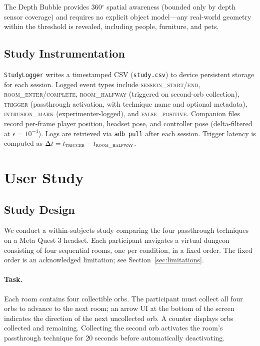 \documentclass{styling/vgtc} %
\begin{document}
The Depth Bubble provides 360$^\circ$ spatial awareness (bounded only by
depth sensor coverage) and requires no explicit object model---any
real-world geometry within the threshold is revealed, including people,
furniture, and pets.

\subsection{Study Instrumentation}

\texttt{StudyLogger} writes a timestamped CSV (\texttt{study.csv}) to
device persistent storage for each session. Logged event types include
\textsc{session\_start/end}, \textsc{room\_enter/complete},
\textsc{room\_halfway} (triggered on second-orb collection),
\textsc{trigger} (passthrough activation, with technique name and
optional metadata), \textsc{intrusion\_mark} (experimenter-logged),
and \textsc{false\_positive}. Companion files record per-frame player
position, headset pose, and controller pose (delta-filtered at
$\epsilon = 10^{-4}$). Logs are retrieved via \texttt{adb pull} after
each session. Trigger latency is computed as
$\Delta t = t_{\textsc{trigger}} - t_{\textsc{room\_halfway}}$.


\section{User Study}
\label{sec:study}

\subsection{Study Design}

We conduct a within-subjects study comparing the four passthrough
techniques on a Meta Quest 3 headset. Each participant navigates a
virtual dungeon consisting of four sequential rooms, one per condition,
in a fixed order. The fixed order is an acknowledged limitation; see
Section~\ref{sec:limitations}.

\paragraph{Task.}
Each room contains four collectible orbs. The participant must collect
all four orbs to advance to the next room; an arrow UI at the bottom of
the screen indicates the direction of the next uncollected orb. A counter
displays orbs collected and remaining. Collecting the second orb
activates the room's passthrough technique for 20 seconds before
automatically deactivating.
\end{document}
